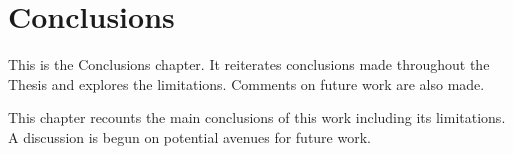 \chapter{Conclusions}
\glsresetall
\label{chap:6-conclusions}

\begin{cabstract}

This is the Conclusions chapter. It reiterates conclusions made throughout the Thesis and explores the limitations. Comments on future work are also made.

\blindtext
\end{cabstract}

This chapter recounts the main conclusions of this work including its limitations. A discussion is begun on potential avenues for future work.

\clearpage




